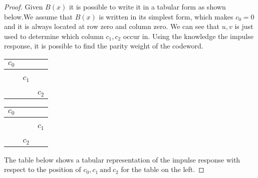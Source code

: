 \documentclass[fontsize=12pt]{article}
\theoremstyle{definition}
\begin{document}
\begin{proof}
Given $B(x)$ it is possible to write it in a tabular form as shown below.We assume that $B(x)$ is written in its simplest form, which makes $c_0=0$ and it is always located at row zero and column zero. We can see that $u,v$ is just used to determine which column $c_1,c_2$ occur in. Using the knowledge the impulse response, it is possible to find the parity weight of the codeword. 

\begin{center}
\begin{tabular}{| c | c | c |}
\hline
$c_0$  & & \\
\hline
 & & \\
\hline
 & & \\
\hline
 &$c_1$ & \\
\hline
 & & \\
\hline
 & & \\
\hline
& & $c_2$\\
\hline
\end{tabular}
\quad
\begin{tabular}{| c | c | c |}
\hline
$c_0$  & & \\
\hline
 & & \\
\hline
 & & \\
\hline
 & & $c_1$ \\
\hline
 & & \\
\hline
 & & \\
\hline
& $c_2$ & \\
\hline
\end{tabular}
\end{center}
The table below shows a tabular representation of the impulse response with respect to the position of $c_0,c_1~\text{and} ~c_2$ for the table on the left.


\end{proof}
\end{document}
